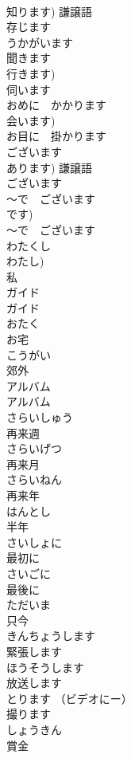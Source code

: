 \documentclass[8pt]{extreport}
\begin{document}
\begin{CJK}{UTF8}{min}
\\	知ります) 謙譲語 
\\	存じます	
\\	うかがいます	
\\	聞きます 
\\	行きます) 
\\	伺います	
\\	おめに　かかります	
\\	会います) 
\\	お目に　掛かります	
\\	ございます	
\\	あります) 謙譲語 
\\	ございます	
\\	〜で　ございます	
\\	です) 
\\	〜で　ございます		
\\	わたくし	
\\	わたし) 
\\	私 
\\	ガイド	
\\	ガイド		
\\	おたく	
\\	お宅	
\\	こうがい	
\\	郊外		
\\	アルバム	
\\	アルバム		
\\	さらいしゅう	
\\	再来週	
\\	さらいげつ	
\\	再来月		
\\	さらいねん	
\\	再来年		
\\	はんとし	
\\	半年		
\\	さいしょに	
\\	最初に	
\\	さいごに	
\\	最後に	
\\	ただいま	
\\	只今	
\\	きんちょうします	
\\	緊張します		
\\	ほうそうします	
\\	放送します		
\\	とります （ビデオにー）	
\\	撮ります		
\\	しょうきん	
\\	賞金		

\end{CJK}
\end{document}

